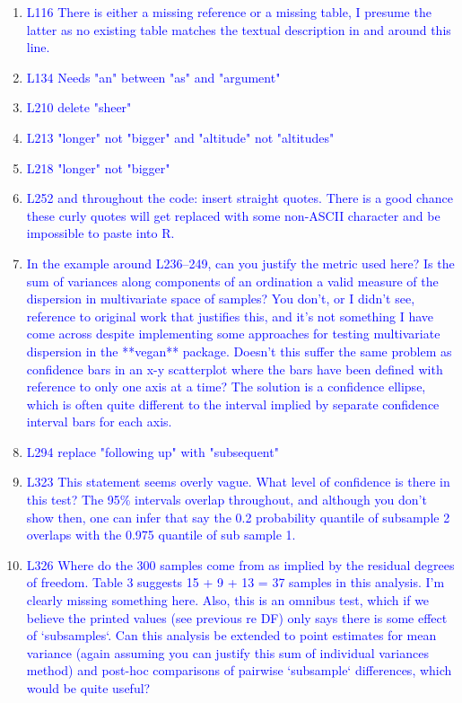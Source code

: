 \documentclass[12pt,letterpaper]{article}
\begin{document}
\begin{enumerate}
\item{\textcolor{blue}{L116 There is either a missing reference or a missing table, I presume the latter as no existing table matches the textual description in and around this line.}}

\item{\textcolor{blue}{L134 Needs "an" between "as" and "argument"}}

\item{\textcolor{blue}{L210 delete "sheer"}}

\item{\textcolor{blue}{L213 "longer" not "bigger" and "altitude" not "altitudes"}}

\item{\textcolor{blue}{L218 "longer" not "bigger"}}

\item{\textcolor{blue}{L252 and throughout the code: insert straight quotes. There is a good chance these curly quotes will get replaced with some non-ASCII character and be impossible to paste into R.}}

\item{\textcolor{blue}{In the example around L236--249, can you justify the metric used here? Is the sum of variances along components of an ordination a valid measure of the dispersion in multivariate space of samples? You don't, or I didn't see, reference to original work that justifies this, and it's not something I have come across despite implementing some approaches for testing multivariate dispersion in the **vegan** package. Doesn't this suffer the same problem as confidence bars in an x-y scatterplot where the bars have been defined with reference to only one axis at a time? The solution is a confidence ellipse, which is often quite different to the interval implied by separate confidence interval bars for each axis.}}

\item{\textcolor{blue}{L294 replace "following up" with "subsequent"}}

\item{\textcolor{blue}{L323 This statement seems overly vague. What level of confidence is there in this test? The 95\% intervals overlap throughout, and although you don't show then, one can infer that say the 0.2 probability quantile of subsample 2 overlaps with the 0.975 quantile of sub sample 1.}}

\item{\textcolor{blue}{L326 Where do the 300 samples come from as implied by the residual degrees of freedom. Table 3 suggests 15 + 9 + 13 = 37 samples in this analysis. I'm clearly missing something here. Also, this is an omnibus test, which if we believe the printed values (see previous re DF) only says there is some effect of `subsamples`. Can this analysis be extended to point estimates for mean variance (again assuming you can justify this sum of individual variances method) and post-hoc comparisons of pairwise `subsample` differences, which would be quite useful?}}


\end{enumerate}
\end{document}
